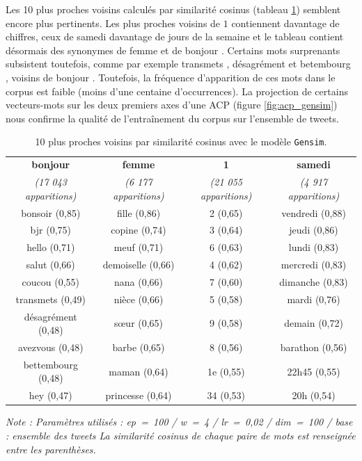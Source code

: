 \documentclass[11pt,french,french]{article}
\begin{document}
Les 10 plus proches voisins calculés par similarité cosinus (tableau
\ref{table:knn_gensim}) semblent encore plus pertinents. Les plus
proches voisins de \og \(1\) \fg contiennent davantage de chiffres, ceux
de \og samedi \fg davantage de jours de la semaine et le tableau
contient désormais des synonymes de \og femme \fg et de \og bonjour \fg.
Certains mots surprenants subsistent toutefois, comme par exemple
\og transmets \fg{}, \og désagrément \fg{} et \og betembourg \fg{},
voisins de \og bonjour \fg{}. Toutefois, la fréquence d'apparition de
ces mots dans le corpus est faible (moins d'une centaine d'occurrences).
La projection de certains vecteurs-mots sur les deux premiers axes d'une
ACP (figure \ref{fig:acp_gensim}) nous confirme la qualité de
l'entraînement du corpus sur l'ensemble de tweets.

\begin{table}[h]
\begin{center}
\begin{tabular}{|c|c|c|c|}
    \hline
\textbf{bonjour} & \textbf{femme} & \textbf{1} & \textbf{samedi} \tabularnewline
\emph{(17 043 apparitions)} & \emph{(6 177 apparitions)} & \emph{(21 055 apparitions)} & \emph{(4 917 apparitions)} \tabularnewline
       \hline
bonsoir (0,85) & fille (0,86) & 2 (0,65) & vendredi (0,88) \tabularnewline
bjr (0,75) & copine (0,74) & 3 (0,64) & jeudi (0,86) \tabularnewline
hello (0,71) & meuf (0,71) & 6 (0,63) & lundi (0,83) \tabularnewline
salut (0,66) & demoiselle (0,66) & 4 (0,62) & mercredi (0,83) \tabularnewline
coucou (0,55) & nana (0,66) & 7 (0,60) & dimanche (0,83) \tabularnewline
transmets (0,49) & nièce (0,66) & 5 (0,58) & mardi (0,76) \tabularnewline
désagrément (0,48) & sœur (0,65) & 9 (0,58) & demain (0,72) \tabularnewline
avezvous (0,48) & barbe (0,65) & 8 (0,56) & barathon (0,56) \tabularnewline
bettembourg (0,48) & maman (0,64) & 1e (0,55) & 22h45 (0,55) \tabularnewline
hey (0,47) & princesse (0,64) & 34 (0,53) & 20h (0,54) \tabularnewline
    \hline
 \end{tabular}
\captionsetup{margin=0cm,format=hang,justification=justified}
\caption{10 plus proches voisins par similarité cosinus avec le modèle \texttt{Gensim}.}\label{table:knn_gensim}
\end{center}
\vspace{-0.3cm}
\footnotesize
\emph{Note : Paramètres utilisés : ep = 100 / w = 4 / lr = 0,02 / dim = 100 / base : ensemble des tweets\newline
La similarité cosinus de chaque paire de mots est renseignée entre les parenthèses.}
\end{table}
\end{document}
